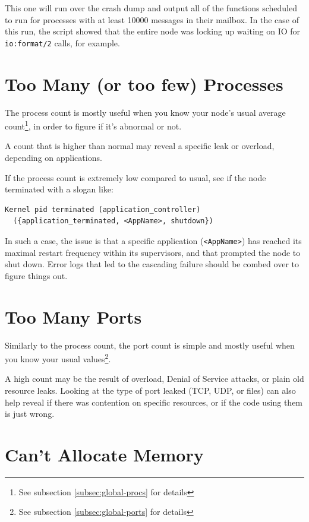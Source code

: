 \documentclass[11pt, oneside]{book}   	%
\newcommand{\function}[1]{\Verb`#1`}
\newcommand{\expression}[1]{\Verb`#1`}
\begin{document}
This one will run over the crash dump and output all of the functions scheduled to run for processes with at least 10000 messages in their mailbox. In the case of this run, the script showed that the entire node was locking up waiting on IO for \function{io:format/2} calls, for example.

\section{Too Many (or too few) Processes}

The process count is mostly useful when you know your node's usual average count\footnote{See subsection \ref{subsec:global-procs} for details}, in order to figure if it's abnormal or not.

A count that is higher than normal may reveal a specific leak or overload, depending on applications.

If the process count is extremely low compared to usual, see if the node terminated with a slogan like:

\begin{Verbatim}
Kernel pid terminated (application_controller)
  ({application_terminated, <AppName>, shutdown})
\end{Verbatim}

In such a case, the issue is that a specific application (\expression{<AppName>}) has reached its maximal restart frequency within its supervisors, and that prompted the node to shut down. Error logs that led to the cascading failure should be combed over to figure things out.

\section{Too Many Ports}

Similarly to the process count, the port count is simple and mostly useful when you know your usual values\footnote{See subsection \ref{subsec:global-ports} for details}.

A high count may be the result of overload, Denial of Service attacks, or plain old resource leaks. Looking at the type of port leaked (TCP, UDP, or files) can also help reveal if there was contention on specific resources, or if the code using them is just wrong.

\section{Can't Allocate Memory}
\end{document}
